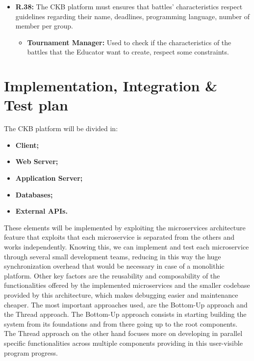 \documentclass{article}
\begin{document}
{\begin{itemize}
\begin{itemize}
              \item \textbf{Account Manager:} Used to allow Students to access their, or others'
              profile pages and visualize the badges in it.
              \item \textbf{Account Manager:} Used to retrieve Student's data.
          \end{itemize}
    \item \textbf{R.38:} The CKB platform must ensures that battles' characteristics respect guidelines
          regarding their name, deadlines, programming language, number of member per group.
          \begin{itemize}
            \item \textbf{Tournament Manager:} Used to check if the characteristics of the battles
              that the Educator want to create, respect some constraints.
          \end{itemize}
\end{itemize}

\newpage
\pagestyle{ImplementationIntegrationTestStyle}
\section{Implementation, Integration \& Test plan}
    The CKB platform will be divided in:
    \begin{itemize}
        \item \textbf{Client;}
        \item \textbf{Web Server;}
        \item \textbf{Application Server;}
        \item \textbf{Databases;}
        \item \textbf{External APIs.}
    \end{itemize}
    These elements will be implemented by exploiting the microservices architecture feature that 
    exploits that each microservice is separated from the others and works independently.
    Knowing this, we can implement and test each microservice through several small 
    development teams, reducing in this way the huge synchronization overhead that would be
    necessary in case of a monolithic platform. 
    Other key factors are the reusability and composability of the functionalities offered by the
    implemented microservices and the smaller codebase provided by this architecture, which makes
    debugging easier and maintenance cheaper.
    The most important approaches used, are the Bottom-Up approach and the Thread approach.
    The Bottom-Up approach consists in starting building the system from its foundations and
    from there going up to the root components.
    The Thread approach on the other hand focuses more on developing in parallel specific 
    functionalities across multiple components providing in this user-visible program progress.

}
\end{document}

